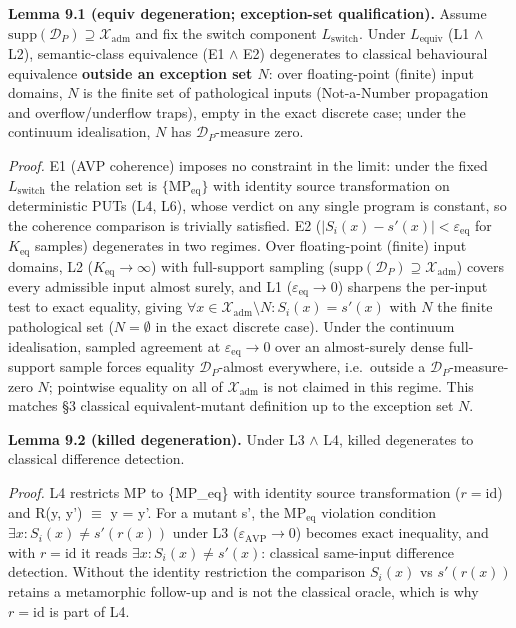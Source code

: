\documentclass[manuscript,screen,review]{acmart}
\begin{document}
\textbf{Lemma 9.1 (equiv degeneration; exception-set
qualification).} Assume
$\mathrm{supp}(\mathcal{D}_P) \supseteq \mathcal{X}_{\mathrm{adm}}$ and
fix the switch component $L_{\mathrm{switch}}$.
Under $L_{\mathrm{equiv}}$ (L1 $\wedge$ L2), semantic-class equivalence
(E1 $\wedge$ E2) degenerates to classical behavioural equivalence
\textbf{outside an exception set $N$}: over floating-point (finite)
input domains, $N$ is the finite set of pathological inputs
(Not-a-Number propagation and overflow/underflow traps), empty in the
exact discrete case; under the continuum idealisation, $N$ has
$\mathcal{D}_P$-measure zero.

\emph{Proof.} E1 (AVP coherence) imposes no constraint in the limit:
under the fixed $L_{\mathrm{switch}}$ the relation set is
$\{\mathrm{MP}_{\mathrm{eq}}\}$ with identity source transformation on
deterministic PUTs (L4, L6), whose verdict on any single program is
constant, so the coherence comparison is trivially satisfied. E2
($|S_i(x) - s'(x)| < \varepsilon_{\mathrm{eq}}$ for $K_{\mathrm{eq}}$ samples)
degenerates in two regimes. Over floating-point (finite) input domains,
L2 ($K_{\mathrm{eq}} \to \infty$) with full-support sampling
($\mathrm{supp}(\mathcal{D}_P) \supseteq \mathcal{X}_{\mathrm{adm}}$)
covers every admissible input almost surely, and L1
($\varepsilon_{\mathrm{eq}} \to 0$) sharpens the per-input test to exact
equality, giving
$\forall x \in \mathcal{X}_{\mathrm{adm}} \setminus N: S_i(x) = s'(x)$
with $N$ the finite pathological set ($N = \emptyset$ in the exact
discrete case). Under the continuum idealisation, sampled agreement at
$\varepsilon_{\mathrm{eq}} \to 0$ over an almost-surely dense
full-support sample forces equality $\mathcal{D}_P$-almost everywhere,
i.e.\ outside a $\mathcal{D}_P$-measure-zero $N$; pointwise equality on
all of $\mathcal{X}_{\mathrm{adm}}$ is not claimed in this regime. This
matches \citet{d7c38286734419b52de4262c9802ebdfcf4b9447} §3 classical equivalent-mutant definition
up to the exception set $N$.

\textbf{Lemma 9.2 (killed degeneration).} Under L3 $\wedge$ L4, killed
degenerates to classical difference detection.

\emph{Proof.} L4 restricts MP to \{MP\_eq\} with identity source
transformation ($r = \mathrm{id}$) and R(y, y') $\equiv$ y = y'. For a
mutant s', the $\mathrm{MP}_{\mathrm{eq}}$ violation condition
$\exists x: S_i(x) \neq s'(r(x))$ under L3 ($\varepsilon_{\mathrm{AVP}} \to 0$)
becomes exact inequality, and with $r = \mathrm{id}$ it reads
$\exists x: S_i(x) \neq s'(x)$: classical same-input difference
detection. Without the identity restriction the comparison
$S_i(x)$ vs $s'(r(x))$ retains a metamorphic follow-up and is not the
classical oracle, which is why $r = \mathrm{id}$ is part of L4.
\end{document}
